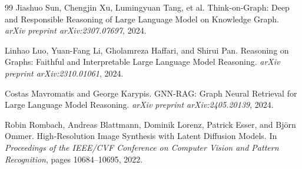 \documentclass[11pt, twocolumn]{article}
\begin{document}
\begin{thebibliography}{99}
Jiashuo Sun, Chengjin Xu, Lumingyuan Tang, et al.
\newblock Think-on-Graph: Deep and Responsible Reasoning of Large Language Model on Knowledge Graph.
\newblock \emph{arXiv preprint arXiv:2307.07697}, 2024.

Linhao Luo, Yuan-Fang Li, Gholamreza Haffari, and Shirui Pan.
\newblock Reasoning on Graphs: Faithful and Interpretable Large Language Model Reasoning.
\newblock \emph{arXiv preprint arXiv:2310.01061}, 2024.

Costas Mavromatis and George Karypis.
\newblock GNN-RAG: Graph Neural Retrieval for Large Language Model Reasoning.
\newblock \emph{arXiv preprint arXiv:2405.20139}, 2024.

Robin Rombach, Andreas Blattmann, Dominik Lorenz, Patrick Esser, and Bj{\"o}rn Ommer.
\newblock High-Resolution Image Synthesis with Latent Diffusion Models.
\newblock In \emph{Proceedings of the IEEE/CVF Conference on Computer Vision and Pattern Recognition}, pages 10684--10695, 2022.

\end{thebibliography}
\end{document}
